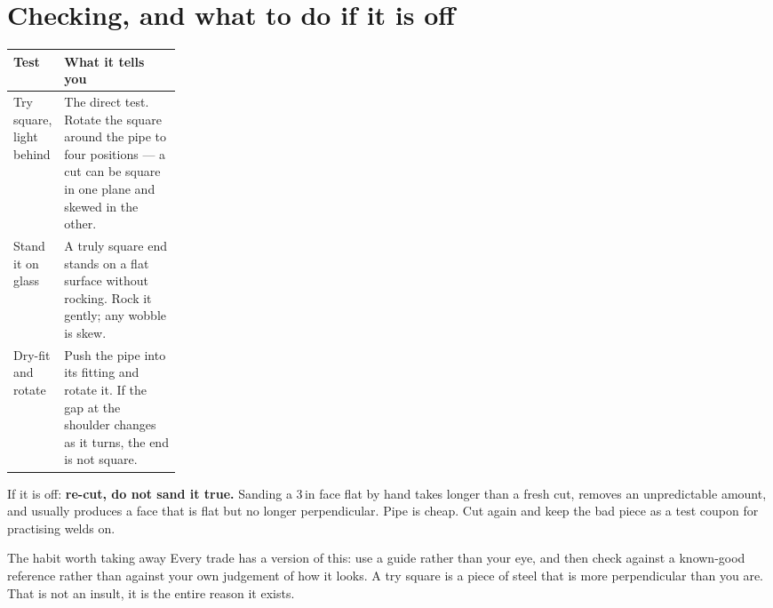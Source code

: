 \section{Checking, and what to do if it is off}
\begin{tabularx}{\linewidth}{@{}p{0.22\linewidth}L@{}}
\toprule
\textbf{Test} & \textbf{What it tells you}\\
\midrule
Try square, light behind & The direct test. Rotate the square around the pipe to four positions --- a cut can be square in one plane and skewed in the other.\\
Stand it on glass & A truly square end stands on a flat surface without rocking. Rock it gently; any wobble is skew.\\
Dry-fit and rotate & Push the pipe into its fitting and rotate it. If the gap at the shoulder changes as it turns, the end is not square.\\
\bottomrule
\end{tabularx}

If it is off: \textbf{re-cut, do not sand it true.} Sanding a 3\,in face flat by
hand takes longer than a fresh cut, removes an unpredictable amount, and usually
produces a face that is flat but no longer perpendicular. Pipe is cheap. Cut
again and keep the bad piece as a test coupon for practising welds on.


\begin{telospanel}{The habit worth taking away}
Every trade has a version of this: use a guide rather than your eye, and then
check against a known-good reference rather than against your own judgement of
how it looks. A try square is a piece of steel that is more perpendicular than
you are. That is not an insult, it is the entire reason it exists.
\end{telospanel}

